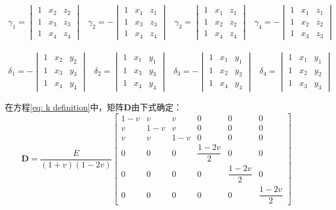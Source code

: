 \begin{CJK*}{UTF8}{song}
\begin{equation}
\begin{array}{cccc}
\gamma_1 = \begin{vmatrix}
1 & x_2 & z_2 \\ 
1 & x_3 & z_3 \\ 
1 & x_4 & z_4
\end{vmatrix} &  \gamma_2 = -\begin{vmatrix}
1 & x_1 & z_1 \\ 
1 & x_3 & z_3 \\ 
1 & x_4 & z_4
\end{vmatrix} & \gamma_3 = \begin{vmatrix}
1 & x_1 & z_1 \\ 
1 & x_2 & z_2 \\ 
1 & x_4 & z_4
\end{vmatrix} & \gamma_4 = -\begin{vmatrix}
1 & x_1 & z_1 \\ 
1 & x_2 & z_2 \\ 
1 & x_3 & z_3
\end{vmatrix}
\end{array} 
\end{equation}

\begin{equation}
\begin{array}{cccc}
\delta_1 = -\begin{vmatrix}
1 & x_2 & y_2 \\ 
1 & x_3 & y_3 \\ 
1 & x_4 & y_4
\end{vmatrix} &  \delta_2 = \begin{vmatrix}
1 & x_1 & y_1 \\ 
1 & x_3 & y_3 \\ 
1 & x_4 & y_4
\end{vmatrix} & \delta_3 = -\begin{vmatrix}
1 & x_1 & y_1 \\ 
1 & x_2 & y_2 \\ 
1 & x_4 & y_4
\end{vmatrix} & \delta_4 = \begin{vmatrix}
1 & x_1 & y_1 \\ 
1 & x_2 & y_2 \\ 
1 & x_3 & y_3
\end{vmatrix}
\end{array} 
\end{equation}

在方程\cref{eq: k definition}中，矩阵$ \mathbf{D} $由下式确定：
\begin{equation}
\mathbf{D} = \dfrac{E}{(1+v)(1-2v)} \begin{bmatrix}
1-v & v & v & 0 & 0 & 0 \\ 
v & 1-v & v & 0 & 0 & 0 \\ 
v & v & 1-v & 0 & 0 & 0 \\ 
0 & 0 & 0 & \dfrac{1-2v}{2} & 0 & 0 \\ 
0 & 0 & 0 & 0 & \dfrac{1-2v}{2} & 0 \\ 
0 & 0 & 0 & 0 & 0 & \dfrac{1-2v}{2}
\end{bmatrix} 
\end{equation}


\end{CJK*}
